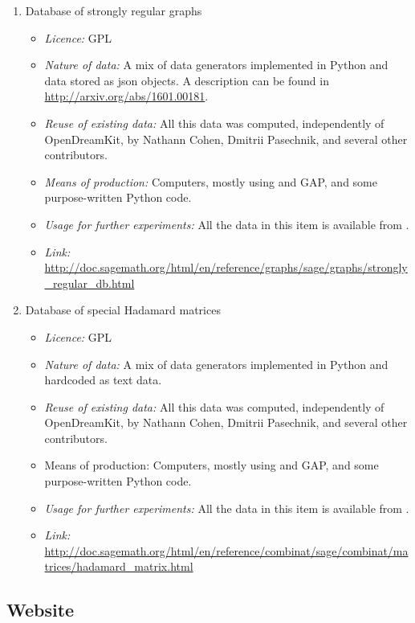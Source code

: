\documentclass{../../Proposal/LaTeX-proposal/deliverablereport}
\begin{document}
\begin{description}
\begin{enumerate}
\begin{itemize}
\end{itemize}


\item{Database of strongly regular graphs}
\begin{itemize}
\item\textit{Licence:}  GPL
\item\textit{Nature of data:} A mix of data generators implemented in Python and
data stored as json objects. A description can be found in \href{http://arxiv.org/abs/1601.00181}{http://arxiv.org/abs/1601.00181}.
\item\textit{Reuse of existing data:} All this data was computed,
  independently of OpenDreamKit, by Nathann Cohen, Dmitrii Pasechnik,
  and several other \Sage contributors.
\item\textit{Means of production:} Computers, mostly using \Sage and GAP, and some purpose-written
Python code.
\item\textit{Usage for further experiments:} All the data  in this item is available from \Sage.
\item\textit{Link:} \url{http://doc.sagemath.org/html/en/reference/graphs/sage/graphs/strongly_regular_db.html}
\end{itemize}


\item{Database of special Hadamard matrices}
\begin{itemize}
\item\textit{Licence:} GPL
\item\textit{Nature of data:} A mix of data generators implemented in Python and hardcoded as text data.
\item\textit{Reuse of existing data:} All this data was computed, independently of OpenDreamKit, by Nathann Cohen, Dmitrii Pasechnik,
and several other \Sage contributors.
\item{Means of production:} Computers, mostly using \Sage and GAP, and some purpose-written
Python code.
\item\textit{Usage for further experiments:} All the data  in this item is available from \Sage.
\item\textit{Link:} \url{http://doc.sagemath.org/html/en/reference/combinat/sage/combinat/matrices/hadamard_matrix.html}
\end{itemize}
\end{enumerate}
\end{description}



\subsection{Website}
\end{document}
